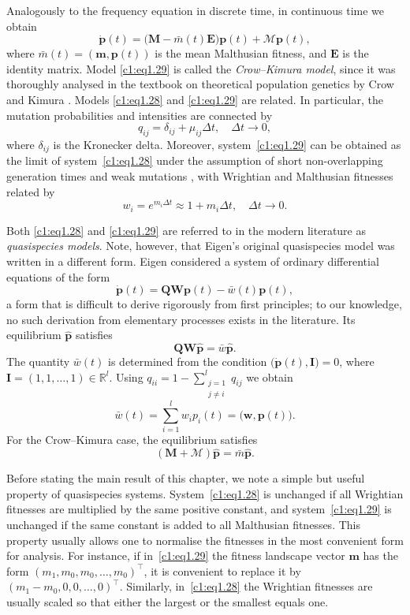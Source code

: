 \documentclass[12pt]{report}
\newcommand{\R}{\mathbb{R}}
\newcommand{\bs}[1]{\bm{#1}}
\theoremstyle{definition}
\theoremstyle{remark}
\begin{document}
\medskip
Analogously to the frequency equation in discrete time, in
continuous time we obtain
\begin{equation}
  \dot{\bs{p}}(t)
  =\bigl(\bs{M}-\bar{m}(t)\bs{E}\bigr)\bs{p}(t)+\bs{\mathcal{M}}\bs{p}(t),
  \label{c1:eq1.29}
\end{equation}
where $\bar{m}(t)=(\bs{m},\bs{p}(t))$ is the mean Malthusian fitness, and  $\bs{E}$ is the 
identity matrix. 
 Model \eqref{c1:eq1.29} is
called the \emph{Crow--Kimura model}, since it was thoroughly analysed
in the textbook on theoretical population genetics by Crow and Kimura
\cite{c1:Crow1970}.
Models \eqref{c1:eq1.28} and \eqref{c1:eq1.29} are related. In 
particular, the mutation probabilities and intensities are connected 
by
\[
q_{ij}=\delta_{ij}+\mu_{ij}\Delta t, \quad \Delta t\to 0,
\]
where $\delta_{ij}$ is the Kronecker delta. Moreover, 
system~\eqref{c1:eq1.29} can be obtained as the limit of 
system~\eqref{c1:eq1.28} under the assumption of short non-overlapping 
generation times and weak mutations \cite{c1:Hofbauer1985}, with 
Wrightian and Malthusian fitnesses related by
\[
w_i=e^{m_i\Delta t}\approx 1+m_i\Delta t, \quad \Delta t\to 0.
\]

Both \eqref{c1:eq1.28} and \eqref{c1:eq1.29} are referred to in the 
modern literature as \textit{quasispecies models}. Note, however, 
that Eigen's original quasispecies model \cite{c1:Eigen1971} was 
written in a different form. Eigen considered a system of ordinary 
differential equations of the form
\begin{equation}
  \dot{\bs{p}}(t)=\bs{QW}\bs{p}(t)-\bar{w}(t)\bs{p}(t),
  \label{c1:eq1.30}
\end{equation}
a form that is difficult to derive rigorously from first principles;
to our knowledge, no such derivation from elementary processes
exists in the literature.
Its equilibrium $\hat{\bs{p}}$ satisfies
\[
  \bs{QW}\hat{\bs{p}}=\bar{w}\hat{\bs{p}}.
\]
The quantity $\bar{w}(t)$ is determined from the condition
$\bigl(\bs{\dot{p}}(t),\bs{I}\bigr)=0$, where
$\bs{I}=(1,1,\ldots,1)\in\R^{l}$. Using $q_{ii}=1-\sum_{\substack{j=1\\j\neq i}}^{l}q_{ij}$
we obtain
\[
\bar{w}(t)=\sum_{i=1}^{l}w_i p_i(t)=\bigl(\bs{w},\bs{p}(t)\bigr).
\]
For the Crow--Kimura case, the equilibrium satisfies
\begin{equation}
	(\bs{M}+\bs{\mathcal{M}})\hat{\bs{p}}=\bar{m}\hat{\bs{p}}.
	\label{c1:eq1.31}
\end{equation}

Before stating the main result of this chapter, we note a simple but
useful property of quasispecies systems. System~\eqref{c1:eq1.28} is
unchanged if all Wrightian fitnesses are multiplied by the same
positive constant, and system~\eqref{c1:eq1.29} is unchanged if the
same constant is added to all Malthusian fitnesses. This property
usually allows one to normalise the fitnesses in the most convenient
form for analysis. For instance, if in~\eqref{c1:eq1.29} the fitness
landscape vector $\bs{m}$ has the form
$(m_1,m_0,m_0,\ldots,m_0)^\top$, it is convenient to replace it by
$(m_1-m_0,0,0,\ldots,0)^\top$. Similarly, in~\eqref{c1:eq1.28} the
Wrightian fitnesses are usually scaled so that either the largest or
the smallest equals one.
\end{document}
